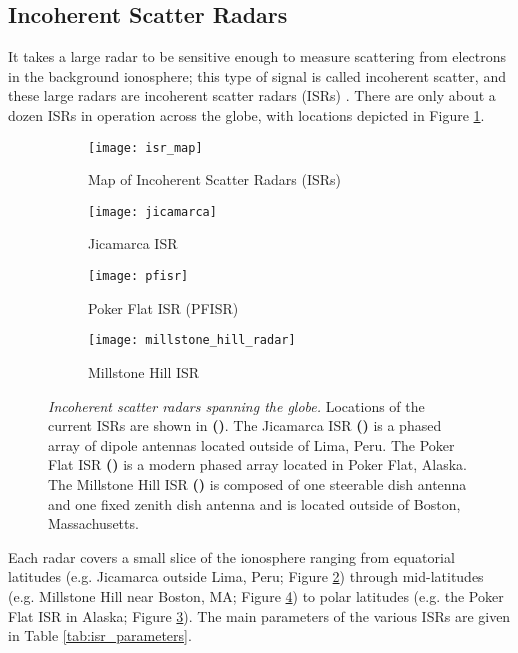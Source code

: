 \subsection{Incoherent Scatter Radars}
\label{intro_isrs}
It takes a large radar to be sensitive enough to measure scattering from electrons in the background ionosphere; this type of signal is called incoherent scatter, and these large radars are incoherent scatter radars (ISRs) \autocite{Gor58}. There are only about a dozen ISRs in operation across the globe, with locations depicted in Figure \ref{fig:isr_map}.
\begin{figure}[ptb]
 \centering
 \begin{subfigure}{\textwidth}
  \centering
  \texttt{[image: isr\_map]}
  \caption{Map of Incoherent Scatter Radars (ISRs)}
  \label{fig:isr_map}
 \end{subfigure}
 \begin{minipage}[b]{0.49\textwidth}
 \begin{subfigure}[b]{\textwidth}
  \centering
  \texttt{[image: jicamarca]}
  \caption{Jicamarca ISR}
  \label{fig:jicamarca}
 \end{subfigure}
 \begin{subfigure}[b]{\textwidth}
  \centering
  \texttt{[image: pfisr]}
  \caption{Poker Flat ISR (PFISR)}
  \label{fig:pfisr}
 \end{subfigure}
 \end{minipage}
 \begin{subfigure}[b]{0.49\textwidth}
  \centering
  \texttt{[image: millstone\_hill\_radar]}
  \caption{Millstone Hill ISR}
  \label{fig:millstone}
 \end{subfigure}
 \caption[Incoherent scatter radars spanning the globe]{\emph{Incoherent scatter radars spanning the globe.} Locations of the current ISRs are shown in \textbf{()}. The Jicamarca ISR \textbf{()} is a phased array of dipole antennas located outside of Lima, Peru. The Poker Flat ISR \textbf{()} is a modern phased array located in Poker Flat, Alaska. The Millstone Hill ISR \textbf{()} is composed of one steerable dish antenna and one fixed zenith dish antenna and is located outside of Boston, Massachusetts.}
 \label{fig:isrs}
\end{figure}%
Each radar covers a small slice of the ionosphere ranging from equatorial latitudes (e.g. Jicamarca outside Lima, Peru; Figure \ref{fig:jicamarca}) through mid-latitudes (e.g. Millstone Hill near Boston, MA; Figure \ref{fig:millstone}) to polar latitudes (e.g. the Poker Flat ISR in Alaska; Figure \ref{fig:pfisr}). The main parameters of the various ISRs are given in Table \ref{tab:isr_parameters}.
